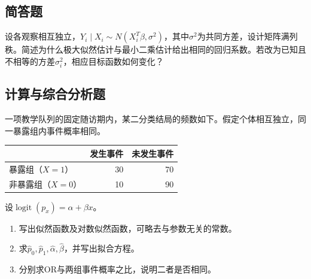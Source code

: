 \par\addvspace{8pt}\noindent\begin{minipage}{\linewidth}

\subsection{简答题}


设各观察相互独立，\(Y_i\mid X_i\sim N(X_i^T\beta,\sigma^2)\)，其中\(\sigma^2\)为共同方差，设计矩阵满列秩。简述为什么极大似然估计与最小二乘估计给出相同的回归系数。若改为已知且不相等的方差\(\sigma_i^2\)，相应目标函数如何变化？


\end{minipage}\par\vspace{5pt}

\par\addvspace{8pt}\noindent\begin{minipage}{\linewidth}

\subsection{计算与综合分析题}


一项教学队列的固定随访期内，某二分类结局的频数如下。假定个体相互独立，同一暴露组内事件概率相同。
\begin{center}\begin{tabular}{lrr}\toprule
 & 发生事件 & 未发生事件\\\midrule
暴露组（\(X=1\)） & 30 & 70\\
非暴露组（\(X=0\)） & 10 & 90\\\bottomrule
\end{tabular}\end{center}
设\(\operatorname{logit}(p_x)=\alpha+\beta x\)。
\begin{enumerate}
\item 写出似然函数及对数似然函数，可略去与参数无关的常数。
\item 求\(\hat p_0,\hat p_1,\hat\alpha,\hat\beta\)，并写出拟合方程。
\item 分别求OR与两组事件概率之比，说明二者是否相同。
\end{enumerate}


\end{minipage}\par\vspace{5pt}


